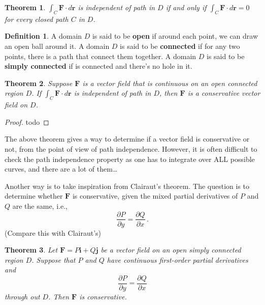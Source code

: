 \documentclass[
]{article}
\newtheorem{theorem}{Theorem}[section]
\theoremstyle{definition}
\newtheorem{definition}{Definition}[section]
\theoremstyle{definition}
\theoremstyle{definition}
\theoremstyle{definition}
\theoremstyle{remark}
\begin{document}
\begin{theorem}
\(\int_C \mathbf{F}\cdot d\mathbf{r}\) is independent of path in \(D\) if and only if
\(\int_C \mathbf{F} \cdot d\mathbf{r} = 0\) for every closed path \(C\) in \(D\).
\end{theorem}

\begin{definition}
A domain \(D\) is said to be \textbf{open} if around each point, we can draw an open ball around it.
A domain \(D\) is said to be \textbf{connected} if for any two points, there is a path that connect them
together.
A domain \(D\) is said to be \textbf{simply connected} if is connected and there's no hole in it.
\end{definition}

\begin{theorem}
Suppose \(\mathbf{F}\) is a vector field that is continuous on an open
connected region \(D\).
If \(\int_C \mathbf{F} \cdot d \mathbf{r}\) is independent of path in \(D\),
then \(\mathbf{F}\) is a conservative vector field on \(D\).
\end{theorem}

\begin{proof}
todo
\end{proof}

The above theorem gives a way to determine if a vector field is conservative or not, from
the point of view of path independence.
However, it is often difficult to check the path independence property as one has to
integrate over ALL possible curves, and there are a lot of them\ldots{}

Another way is to take inspiration from Clairaut's theorem.
The question is to determine whether \(\mathbf{F}\) is conservative, given the mixed partial
derivatives of \(P\) and \(Q\) are the same, i.e.,
\begin{equation*}
    \frac{\partial P}{\partial y} = \frac{\partial Q}{\partial x}\,.
\end{equation*}
(Compare this with Clairaut's)

\begin{theorem}
Let \(\mathbf{F} = P\mathbf{i} + Q\mathbf{j}\) be a vector field on an open simply connected
region \(D\). Suppose that
\(P\) and \(Q\) have continuous first-order partial derivatives and
\begin{equation*}
    \frac{\partial P}{\partial y} = \frac{\partial Q}{\partial x}
\end{equation*}
through out \(D\).
Then \(\mathbf{F}\) is conservative.
\end{theorem}
\end{document}
